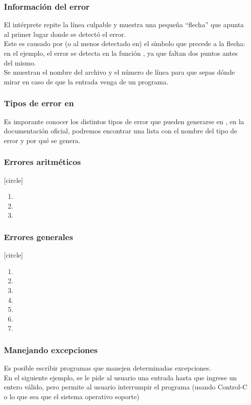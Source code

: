 \begin{frame}
\frametitle{Información del error}
El intérprete repite la línea culpable y muestra una pequeña \enquote{flecha} que apunta al primer lugar donde se detectó el error.
\\
\bigskip
Este es causado por (o al menos detectado en) el símbolo que precede a la flecha: en el ejemplo, el error se detecta en la función , ya que faltan dos puntos \azulfuerte{(:)} antes del mismo.
\\
\bigskip
Se muestran el nombre del archivo y el número de línea para que sepas dónde mirar en caso de que la entrada venga de un programa.    
\end{frame}
\begin{frame}
\frametitle{Tipos de error en \python}
Es imporante conocer los distintos tipos de error que pueden generarse en \python, en la documentación oficial, podremos encontrar una lista con el nombre del tipo de error y por qué se genera.
\end{frame}
\begin{frame}
\frametitle{Errores aritméticos}
[circle]
\begin{enumerate}[<+->]
\item {}
\item {}
\item {}
\end{enumerate}
\end{frame}
\begin{frame}
\frametitle{Errores generales}
[circle]
\begin{enumerate}[<+->]
\item {}
\item {}
\item {}
\item {}
\item {}
\item {}
\item {}
\end{enumerate}
\end{frame}
\begin{frame}[fragile]
\frametitle{Manejando excepciones}
Es posible escribir programas que manejen determinadas excepciones. 
\\
\bigskip
En el siguiente ejemplo, se le pide al usuario una entrada hasta que ingrese un entero válido, pero permite al usuario interrumpir el programa (usando Control-C o lo que sea que el sistema operativo soporte)
\end{frame}
